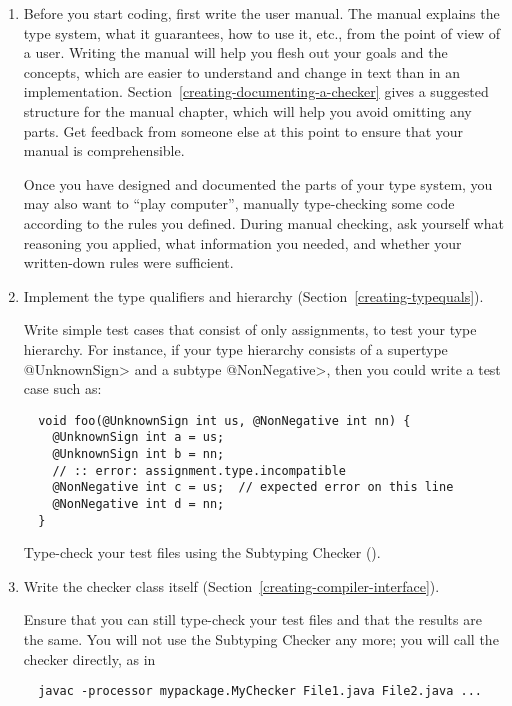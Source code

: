 \begin{enumerate}
\item
  Before you start coding, first write the user manual.  The manual
  explains the type system, what it guarantees, how to use it, etc., from
  the point of view of a user.  Writing the manual will help you flesh out
  your goals and the concepts, which are easier to understand and change in
  text than in an implementation.
  Section~\ref{creating-documenting-a-checker} gives a suggested structure
  for the manual chapter, which will help you avoid omitting any parts.
  Get feedback from someone else at this point to ensure that your manual
  is comprehensible.

  Once you have designed and documented the parts of your type system, you
  may also want to ``play computer'', manually
  type-checking some code according to the rules you defined.
  During manual checking, ask
  yourself what reasoning you applied, what information you needed, and
  whether your written-down rules were sufficient.

\item
  Implement the type qualifiers and hierarchy
  (Section~\ref{creating-typequals}).

  Write simple test cases that consist of only assignments,
  to test your type hierarchy.  For instance, if
  your type hierarchy consists of a supertype \<@UnknownSign> and a subtype
  \<@NonNegative>, then you could write a test case such as:

\begin{Verbatim}
  void foo(@UnknownSign int us, @NonNegative int nn) {
    @UnknownSign int a = us;
    @UnknownSign int b = nn;
    // :: error: assignment.type.incompatible
    @NonNegative int c = us;  // expected error on this line
    @NonNegative int d = nn;
  }
\end{Verbatim}

  Type-check your test files using the Subtyping Checker
  ().

\item
  Write the checker class itself
  (Section~\ref{creating-compiler-interface}).

  Ensure that you can still type-check your test files and that the results
  are the same.  You will not use the Subtyping Checker any more; you will
  call the checker directly, as in

\begin{Verbatim}
  javac -processor mypackage.MyChecker File1.java File2.java ...
\end{Verbatim}


\end{enumerate}
